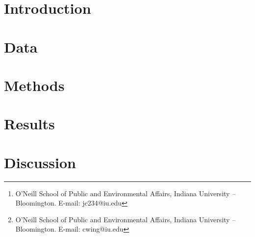 \documentclass[11pt]{article}
\theoremstyle{definition}
\begin{document}
\title{}

\author{%
    Jaehyun Choi\footnote{O'Neill School of Public and Environmental Affairs, Indiana University -- Bloomington. E-mail: jc234@iu.edu}
    \and
    Coady Wing\footnote{O'Neill School of Public and Environmental Affairs, Indiana University -- Bloomington. E-mail: cwing@iu.edu}%
}

\date{\today}

\maketitle
\thispagestyle{empty}

%

%
%

\doublespacing
\setcounter{page}{1}

\section{Introduction}


\section{Data}


\section{Methods}


\section{Results}


\section{Discussion}


\clearpage


\newpage



\appendix
\clearpage

\setcounter{figure}{0} \renewcommand{\thefigure}{A.\arabic{figure}}
\setcounter{table}{0} \renewcommand{\thetable}{A.\arabic{table}}


\clearpage{}
\end{document}
